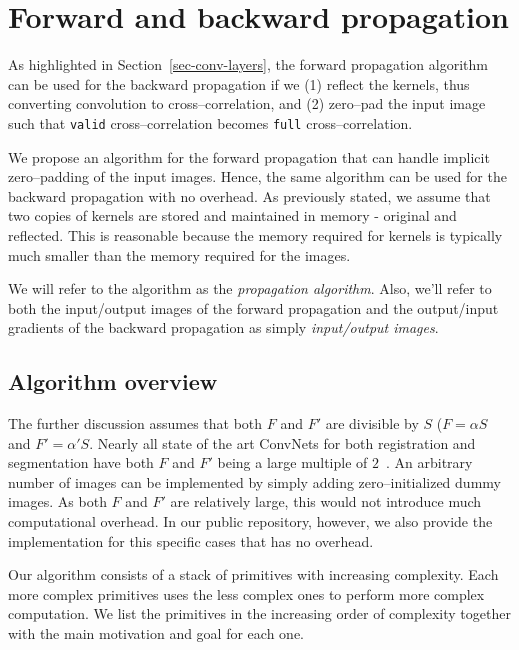 \section{Forward and backward propagation}

  As highlighted in Section~\ref{sec-conv-layers}, the forward
  propagation algorithm can be used for the backward propagation if we
  (1) reflect the kernels, thus converting convolution to
  cross--correlation, and (2) zero--pad the input image such that
  \texttt{valid} cross--correlation becomes \texttt{full}
  cross--correlation.

  We propose an algorithm for the forward propagation that can handle
  implicit zero--padding of the input images. Hence, the same
  algorithm can be used for the backward propagation with no overhead.
  As previously stated, we assume that two copies of kernels are
  stored and maintained in memory - original and reflected.  This is
  reasonable because the memory required for kernels is typically much
  smaller than the memory required for the images.

  We will refer to the algorithm as the \emph{propagation algorithm}.
  Also, we'll refer to both the input/output images of the forward
  propagation and the output/input gradients of the backward
  propagation as simply \emph{input/output images}.

  \subsection{Algorithm overview}

  The further discussion assumes that both $F$ and $F'$ are divisible
  by $S$ ($F = \alpha S$ and $F' = \alpha' S$.  Nearly all state of
  the art ConvNets for both registration and segmentation have both
  $F$ and $F'$ being a large multiple of
  $2$~\cite{krizhevsky2012imagenet, ronneberger2015u,
    simonyan2014very, sermanet2013overfeat, long2015fully,
    tran2015learning, ji20133d, maturana_iros_2015,
    maturana_icra_2014}.  An arbitrary number of images can be
  implemented by simply adding zero--initialized dummy images.  As
  both $F$ and $F'$ are relatively large, this would not introduce
  much computational overhead.  In our public repository, however, we
  also provide the implementation for this specific cases that has no
  overhead.

  Our algorithm consists of a stack of primitives with increasing
  complexity.  Each more complex primitives uses the less complex ones
  to perform more complex computation.  We list the primitives in the
  increasing order of complexity together with the main motivation and
  goal for each one.

